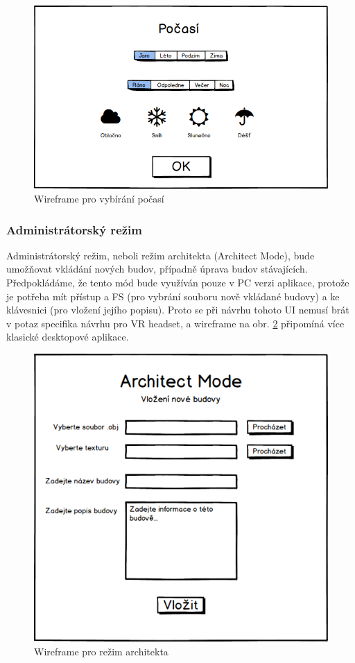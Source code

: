 \documentclass[thesis=B,czech]{FITthesis}[2012/06/26]
\begin{document}
	\begin{figure}
  		\includegraphics[width=\textwidth,height=\textheight,keepaspectratio]{MockPocasi.png}
  		\caption{Wireframe pro vybírání počasí}
  		\label{fig:mockPocasi}
	\end{figure}
	
	\subsubsection{Administrátorský režim}
Administrátorský režim, neboli režim architekta (Architect Mode), bude umožňovat vkládání nových budov, případně úprava budov stávajících. Předpokládáme, že tento mód bude využíván pouze v PC verzi aplikace, protože je potřeba mít přístup a FS (pro vybrání souboru nově vkládané budovy) a ke klávesnici (pro vložení jejího popisu). Proto se při návrhu tohoto UI nemusí brát v potaz specifika návrhu pro VR headset, a wireframe na obr. \ref{fig:ArchitectMock} připomíná více klasické desktopové aplikace.

\begin{figure}
  		\includegraphics[width=\textwidth,height=\textheight,keepaspectratio]{ArchitectMock.png}
  		\caption{Wireframe pro režim architekta}
  		\label{fig:ArchitectMock}
	\end{figure}
	
\end{document}
